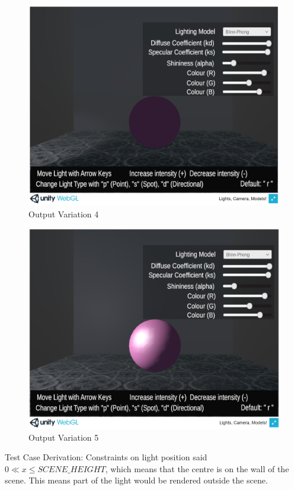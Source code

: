 \documentclass[12pt, titlepage]{article}
\begin{document}
\begin{enumerate}
	\begin{figure}[h]
		\centering
		\includegraphics[scale=0.25]{./images/sphere-lit-spotlight-moveBounds}
		\caption{Output Variation 4}
		\label{fig:spotlight-bounds-left}
	\end{figure}	

	\begin{figure}[h]
		\centering
		\includegraphics[scale=0.25]{./images/sphere-lit-point-moveBounds}
		\caption{Output Variation 5}
		\label{fig:point-bounds-left}
	\end{figure}	

	
	Test Case Derivation: Constraints on light position said $0 \ll 
	x \le SCENE\_HEIGHT$, which means that the centre is on the wall of the 
	scene. This means part of the light would be rendered outside the scene.
	

\end{enumerate}
\end{document}
